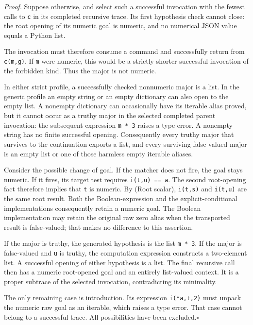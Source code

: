 \documentclass[11pt,letterpaper]{article}
\theoremstyle{definition}\newtheorem{definition}[theorem]{Definition}
\theoremstyle{remark}\newtheorem{remark}[theorem]{Remark}
\begin{document}
\emph{Proof.}
Suppose otherwise, and select such a successful invocation with the
fewest calls to \texttt{c} in its completed recursive trace.  Its first
hypothesis check cannot close: the root opening of its numeric goal is
numeric, and no numerical JSON value equals a Python list.

The invocation must therefore consume a command and successfully return
from \texttt{c(m,g)}.  If \texttt{m} were numeric, this would be a
strictly shorter successful invocation of the forbidden kind.  Thus the
major is not numeric.

In either strict profile, a successfully checked nonnumeric major is a
list.  In the generic profile an empty string or an empty dictionary can
also open to the empty list.  A nonempty dictionary can occasionally
have its iterable alias proved, but it cannot occur as a truthy major
in the selected completed parent invocation: the subsequent expression
\texttt{m * 3} raises a type error.  A nonempty string has no finite
successful opening.  Consequently every truthy major that survives to
the continuation exports a list, and every surviving false-valued
major is an empty list or one of those harmless empty iterable aliases.

Consider the possible change of goal.  If the matcher does not fire,
the goal stays numeric.  If it fires, its target test requires
\texttt{i(t,u) == a}.  The second root-opening fact therefore implies
that \texttt{t} is numeric.  By (Root scalar), \texttt{i(t,s)} and
\texttt{i(t,u)} are the same root result.  Both the Boolean-expression
and the explicit-conditional implementations consequently retain a
numeric goal.  The Boolean implementation may retain the original raw
zero alias when the transported result is false-valued; that makes no
difference to this assertion.

If the major is truthy, the generated hypothesis is the list
\texttt{m * 3}.  If the major is false-valued and \texttt{u} is truthy,
the computation expression constructs a two-element list.  A successful
opening of either hypothesis is a list.  The final recursive call then
has a numeric root-opened goal and an entirely list-valued context.  It
is a proper subtrace of the selected invocation, contradicting its
minimality.

The only remaining case is introduction.  Its expression
\texttt{i(*a,t,2)} must unpack the numeric raw goal as an iterable,
which raises a type error.  That case cannot belong to a successful
trace.  All possibilities have been excluded.\hfill$\square$
\end{document}
